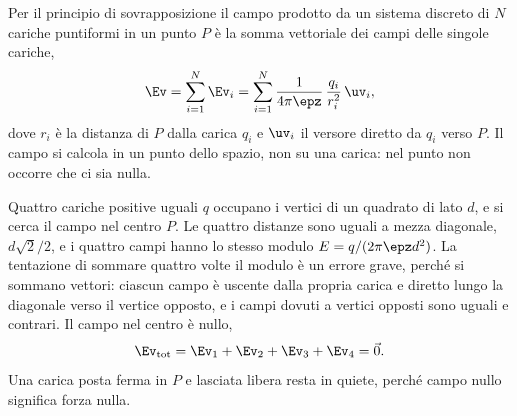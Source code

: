 \documentclass[main.tex]{subfiles}
\begin{document}
Per il principio di sovrapposizione il campo prodotto da un sistema discreto di $N$ cariche puntiformi in un punto $P$ è la somma vettoriale dei campi delle singole cariche,
\[
\Ev=\sum_{i=1}^{N}\Ev_i=\sum_{i=1}^{N}\frac{1}{4\pi\epz}\,\frac{q_i}{r_i^2}\,\uv_i ,
\]
dove $r_i$ è la distanza di $P$ dalla carica $q_i$ e $\uv_i$ il versore diretto da $q_i$ verso $P$. Il campo si calcola in un punto dello spazio, non su una carica: nel punto non occorre che ci sia nulla.

Quattro cariche positive uguali $q$ occupano i vertici di un quadrato di lato $d$, e si cerca il campo nel centro $P$. Le quattro distanze sono uguali a mezza diagonale, $d\sqrt2/2$, e i quattro campi hanno lo stesso modulo $E=q/(2\pi\epz d^2)$. La tentazione di sommare quattro volte il modulo è un errore grave, perché si sommano vettori: ciascun campo è uscente dalla propria carica e diretto lungo la diagonale verso il vertice opposto, e i campi dovuti a vertici opposti sono uguali e contrari. Il campo nel centro è nullo,
\[
\Ev_{\mathrm{tot}}=\Ev_1+\Ev_2+\Ev_3+\Ev_4=\vec 0 .
\]
Una carica posta ferma in $P$ e lasciata libera resta in quiete, perché campo nullo significa forza nulla.
\end{document}
